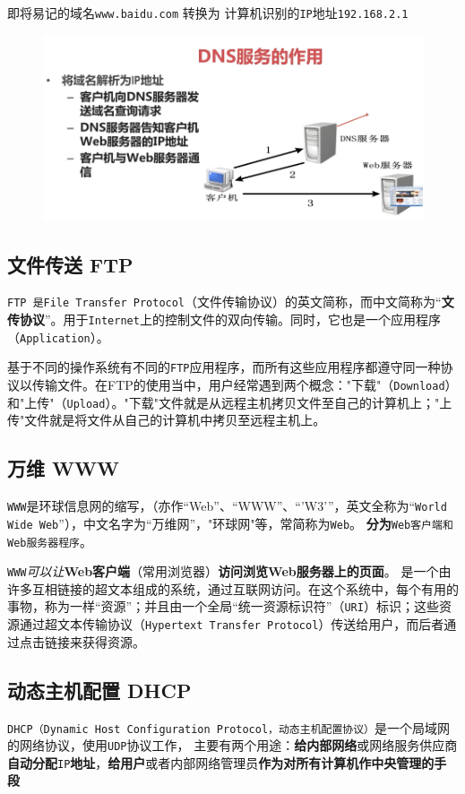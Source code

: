 \documentclass[UTF8,a4paper,12pt]{ctexbook}
\begin{document}
			即将易记的域名\verb|www.baidu.com| 转换为 计算机识别的\verb|IP|地址\verb|192.168.2.1|
			\begin{figure}[h]
				\centering
				\includegraphics[scale=0.5]{figures/DNS.png}
			\end{figure}
			
		\subsection{文件传送 FTP}
			\verb|FTP 是File Transfer Protocol|（文件传输协议）的英文简称，而中文简称为“\textbf{文传协议}”。用于\verb|Internet|上的控制文件的双向传输。同时，它也是一个应用程序（\verb|Application|）。
			
			基于不同的操作系统有不同的\verb|FTP|应用程序，而所有这些应用程序都遵守同一种协议以传输文件。在FTP的使用当中，用户经常遇到两个概念："下载"（\verb|Download|）和"上传"（\verb|Upload|）。"下载"文件就是从远程主机拷贝文件至自己的计算机上；"上传"文件就是将文件从自己的计算机中拷贝至远程主机上。
			
		\subsection{万维 WWW}
			\verb|WWW|是环球信息网的缩写，（亦作“Web”、“WWW”、“'W3'”，英文全称为“\verb|World Wide Web|”），中文名字为“万维网”，"环球网"等，常简称为\verb|Web|。 \textbf{分为}\verb|Web客户端和Web服务器程序|。
			
			 \verb|WWW|\textit{可以让}\textbf{Web客户端}（常用浏览器）\textbf{访问浏览Web服务器上的页面}。 是一个由许多互相链接的超文本组成的系统，通过互联网访问。在这个系统中，每个有用的事物，称为一样“资源”；并且由一个全局“统一资源标识符”（\verb|URI|）标识；这些资源通过超文本传输协议（\verb|Hypertext Transfer Protocol|）传送给用户，而后者通过点击链接来获得资源。
		
		\subsection{动态主机配置 DHCP}
			\verb|DHCP（Dynamic Host Configuration Protocol，动态主机配置协议）|是一个局域网的网络协议，使用\verb|UDP|协议工作， 主要有两个用途：\textbf{给内部网络}或网络服务供应商\textbf{自动分配}\verb|IP|\textbf{地址}，\textbf{给用户}或者内部网络管理员\textbf{作为对所有计算机作中央管理的手段}
		
\end{document}
